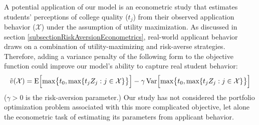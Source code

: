A potential application of our model is an econometric study that estimates students' perceptions of college quality ($t_j$) from their observed application behavior ($\mathcal{X}$) under the assumption of utility maximization. As discussed in section \ref{subsectionRiskAversionEconometrics}, real-world applicant behavior draws on a combination of utility-maximizing and risk-averse strategies. Therefore, adding a variance penalty of the following form to the objective function could improve our model's ability to capture real student behavior:
\begin{equation*}
\tilde v(\mathcal{X})
= \operatorname{E}\Bigl[\max\bigr\{t_0, \max\{t_j Z_j : j \in \mathcal{X}\}\bigr\}\Bigr] 
- \gamma \operatorname{Var}\Bigl[\max\bigr\{t_0, \max\{t_j Z_j : j \in \mathcal{X}\}\bigr\}\Bigr]
\end{equation*}
($\gamma > 0$ is the risk-aversion parameter.) Our study has not considered the portfolio optimization problem associated with this more complicated objective, let alone the econometric task of estimating its parameters from applicant behavior. 
